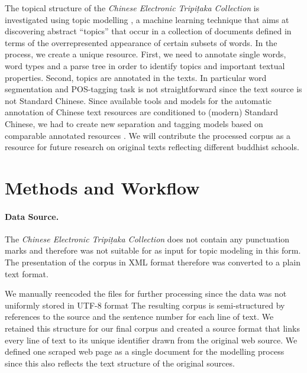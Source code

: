 \documentclass[a4paper,10pt]{article}
\begin{document}
The topical structure of the \textit{Chinese Electronic Tripi{\d{t}}aka
  Collection}  is investigated using topic
modelling \cite{blei2012probabilistic}, a machine learning technique that
aims at discovering abstract ``topics'' that occur in a collection of
documents defined in terms of the overrepresented appearance of certain
subsets of words. In the process, we create a unique resource. First, we
need to annotate single words, word types and a parse tree in order to
identify topics and important textual properties. Second, topics are
annotated in the texts.  In particular word segmentation and POS-tagging
task is not straightforward since the text source is not Standard
Chinese. Since available tools and models for the automatic annotation of
Chinese text resources are conditioned to (modern) Standard Chinese, we had
to create new separation and tagging models based on comparable annotated
resources .  We will contribute the processed
corpus as a resource for future research on original texts reflecting
different buddhist schools.

\section{Methods and Workflow} 

\paragraph{Data Source.} The \textit{Chinese Electronic Tripi{\d{t}}aka
  Collection} does not contain any punctuation marks and therefore was not
suitable for as input for topic modeling in this form. The presentation of
the corpus in XML format  therefore was
converted to a plain text format.
  
We manually reencoded the files for further processing since the data was
not uniformly stored in UTF-8 format The resulting corpus is
semi-structured by references to the source and the sentence number for
each line of text. We retained this structure for our final corpus and
created a source format that links every line of text to its unique
identifier drawn from the original web source. We defined one scraped web
page as a single document for the modelling process since this also
reflects the text structure of the original sources.
    
\end{document}
